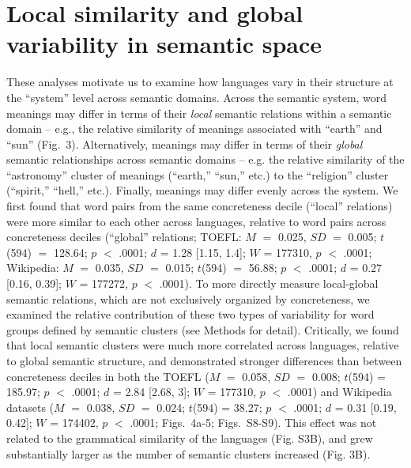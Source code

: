 \documentclass[9pt,twocolumn,twoside,lineno]{pnas-new}
\begin{document}
\section*{Local similarity and global variability in semantic space}
These analyses motivate us to examine how languages vary in their structure at the ``system'' level across semantic domains. Across the semantic system, word meanings may differ in terms of their {\it local} semantic relations within a semantic domain -- e.g., the relative similarity of meanings associated with ``earth'' and ``sun'' (Fig.\ 3). Alternatively, meanings may differ in terms of their {\it global} semantic relationships across semantic domains -- e.g. the relative similarity of the ``astronomy'' cluster of meanings (``earth,'' ``sun,'' etc.) to the ``religion'' cluster (``spirit,'' ``hell,'' etc.). Finally, meanings may differ evenly across the system. We first found that word pairs from the same concreteness decile (``local'' relations) were more similar to each other across languages, relative to word pairs across concreteness deciles (``global'' relations; TOEFL:  $M$  $=$ 0.025, $SD$ $=$  0.005; $t$(594) $=$ 128.64; $p$ $<$ .0001; $d$ = 1.28 [1.15, 1.4];  $W$ = 177310, $p$ $<$ .0001; Wikipedia: $M$  $=$ 0.035, $SD$  $=$  0.015; $t$(594) $=$ 56.88; $p$ $<$ .0001;  $d$ = 0.27 [0.16, 0.39];  $W$ = 177272, $p$ $<$ .0001). To more directly measure local-global semantic relations, which are not exclusively organized by concreteness, we examined the relative contribution of these two types of variability for word groups defined by semantic clusters (see Methods for detail). Critically, we found that local semantic clusters were much more correlated across languages, relative to global semantic structure, and demonstrated stronger differences than between concreteness deciles in both the TOEFL ($M$  $=$ 0.058, $SD$ $=$  0.008;  $t$(594) = 185.97; $p$ $<$ .0001; $d$ = 2.84 [2.68, 3]; $W$ = 177310, $p$ $<$ .0001) and Wikipedia datasets ($M$  $=$ 0.038, $SD$  $=$  0.024; $t$(594) = 38.27; $p$ $<$ .0001;  $d$ = 0.31 [0.19, 0.42]; $W$ = 174402, $p$ $<$ .0001;  Figs.\ 4a-5; Figs.\ S8-S9). This effect was not related to the grammatical similarity of the languages (Fig. S3B), and grew substantially larger as the number of semantic clusters increased (Fig. 3B). 
\end{document}
